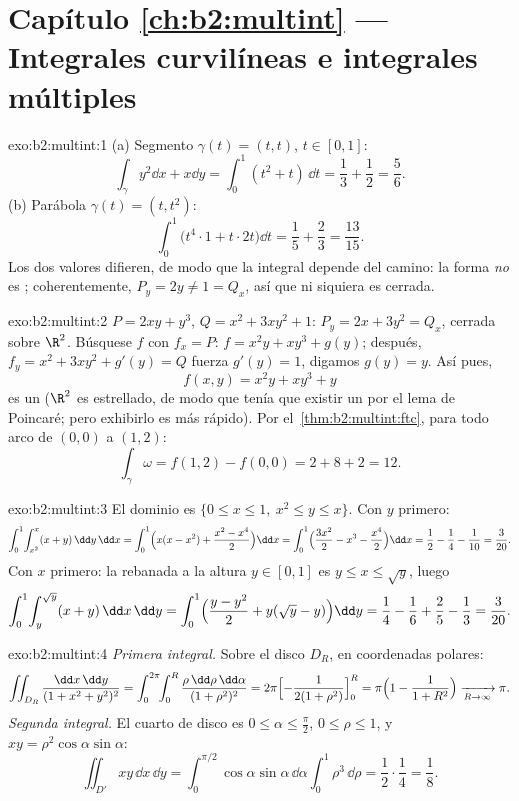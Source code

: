 \section*{Capítulo \ref{ch:b2:multint} --- Integrales curvilíneas e integrales múltiples}

\begin{solution}{exo:b2:multint:1}
(a) Segmento $\gamma(t) = (t, t)$, $t \in [0,1]$:
\[
\int_\gamma y^2\dd x + x\dd y
= \int_0^1 (t^2 + t)\,\dd t = \frac13 + \frac12 = \frac56 .
\]
(b) Parábola $\gamma(t) = (t, t^2)$:
\[
\int_0^1 \bigl(t^4\cdot 1 + t\cdot 2t\bigr)\dd t
= \frac15 + \frac23 = \frac{13}{15} .
\]
Los dos valores difieren, de modo que la integral depende del camino:
la forma \emph{no} es ; coherentemente, $P_y = 2y \neq 1 =
Q_x$, así que ni siquiera es cerrada.
\end{solution}

\begin{solution}{exo:b2:multint:2}
$P = 2xy + y^3$, $Q = x^2 + 3xy^2 + 1$: $P_y = 2x + 3y^2 = Q_x$,
cerrada sobre $\R^2$. Búsquese $f$ con $f_x = P$: $f = x^2y + xy^3 +
g(y)$; después, $f_y = x^2 + 3xy^2 + g'(y) = Q$ fuerza $g'(y) = 1$,
digamos $g(y) = y$. Así pues,
\[
f(x, y) = x^2y + xy^3 + y
\]
es un  ($\R^2$ es estrellado, de modo que tenía que existir
un  por el lema de Poincaré; pero exhibirlo es más rápido).
Por el~\cref{thm:b2:multint:ftc}, para todo arco de $(0,0)$ a
$(1,2)$:
\[
\int_\gamma\omega = f(1, 2) - f(0, 0) = 2 + 8 + 2 = 12 .
\]
\end{solution}

\begin{solution}{exo:b2:multint:3}
El dominio es $\{0 \leq x \leq 1,\ x^2 \leq y \leq x\}$. Con $y$
primero:
\[
\int_0^1\!\int_{x^2}^{x}(x + y)\,\dd y\,\dd x
= \int_0^1\Bigl(x(x - x^2)
+ \frac{x^2 - x^4}{2}\Bigr)\dd x
= \int_0^1\Bigl(\frac{3x^2}{2} - x^3 - \frac{x^4}{2}\Bigr)\dd x
= \frac12 - \frac14 - \frac1{10} = \frac{3}{20} .
\]
Con $x$ primero: la rebanada a la altura $y \in [0, 1]$ es $y \leq x
\leq \sqrt y$, luego
\[
\int_0^1\!\int_{y}^{\sqrt y}(x + y)\,\dd x\,\dd y
= \int_0^1\Bigl(\frac{y - y^2}{2}
+ y(\sqrt y - y)\Bigr)\dd y
= \frac14 - \frac16 + \frac25 - \frac13 = \frac{3}{20} .
\]
\end{solution}

\begin{solution}{exo:b2:multint:4}
\emph{Primera integral.} Sobre el disco $D_R$, en coordenadas
polares:
\[
\iint_{D_R}\frac{\dd x\,\dd y}{(1 + x^2 + y^2)^2}
= \int_0^{2\pi}\!\!\int_0^R
\frac{\rho\,\dd\rho\,\dd\alpha}{(1 + \rho^2)^2}
= 2\pi\Bigl[-\frac{1}{2(1 + \rho^2)}\Bigr]_0^R
= \pi\Bigl(1 - \frac{1}{1 + R^2}\Bigr)
\xrightarrow[R \to \infty]{} \pi .
\]
\emph{Segunda integral.} El cuarto de disco es $0 \leq \alpha \leq
\frac\pi2$, $0 \leq \rho \leq 1$, y $xy =
\rho^2\cos\alpha\sin\alpha$:
\[
\iint_{D'}xy\,\dd x\,\dd y
= \int_0^{\pi/2}\!\!\cos\alpha\sin\alpha\,\dd\alpha
\int_0^1 \rho^3\,\dd\rho
= \frac12\cdot\frac14 = \frac18 .
\]
\end{solution}

